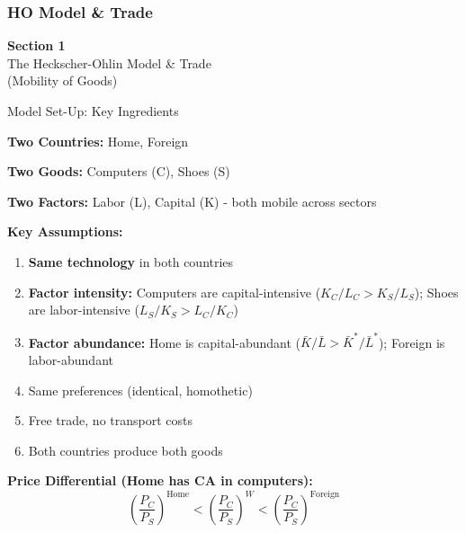 \documentclass{beamer}
\begin{document}
\subsubsection{HO Model \& Trade}
\begin{frame}

\vspace{2cm}

\centering
{\LARGE \textbf{Section 1}} \\[0.5cm]
{\Large The Heckscher-Ohlin Model \& Trade} \\[0.3cm]
{\large (Mobility of Goods)}

\vfill

\end{frame}

\begin{frame}{Model Set-Up: Key Ingredients}

\textbf{Two Countries:} Home, Foreign

\textbf{Two Goods:} Computers (C), Shoes (S)

\textbf{Two Factors:} Labor (L), Capital (K) - both mobile across sectors

\vspace{0.3cm}

\textbf{Key Assumptions:}
\begin{enumerate}
    \item \textbf{Same technology} in both countries
    \item \textbf{Factor intensity:} Computers are capital-intensive ($K_C/L_C > K_S/L_S$); Shoes are labor-intensive ($L_S/K_S > L_C/K_C$)
    \item \textbf{Factor abundance:} Home is capital-abundant ($\bar{K}/\bar{L} > \bar{K}^*/\bar{L}^*$); Foreign is labor-abundant
    \item Same preferences (identical, homothetic)
    \item Free trade, no transport costs
    \item Both countries produce both goods
\end{enumerate}

\vspace{0.3cm}

\textbf{Price Differential (Home has CA in computers):}
$$\left(\frac{P_C}{P_S}\right)^{\text{Home}} < \left(\frac{P_C}{P_S}\right)^{W} < \left(\frac{P_C}{P_S}\right)^{\text{Foreign}}$$

\end{frame}
\end{document}
